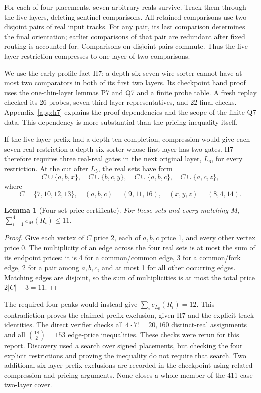 \documentclass[11pt]{article}
\newtheorem{lemma}[theorem]{Lemma}
\begin{document}
For each of four placements, seven arbitrary reals survive. Track them through the five layers, deleting sentinel comparisons. All retained comparisons use two disjoint pairs of real input tracks. For any pair, its last comparison determines the final orientation; earlier comparisons of that pair are redundant after fixed routing is accounted for. Comparisons on disjoint pairs commute. Thus the five-layer restriction compresses to one layer of two comparisons.

We use the early-profile fact H7: a depth-six seven-wire sorter cannot have at most two comparators in both of its first two layers. Its checkpoint hand proof uses the one-thin-layer lemmas P7 and Q7 and a finite probe table. A fresh replay checked its 26 probes, seven third-layer representatives, and 22 final checks. Appendix~\ref{app:h7} explains the proof dependencies and the scope of the finite Q7 data. This dependency is more substantial than the pricing inequality itself.

If the five-layer prefix had a depth-ten completion, compression would give each seven-real restriction a depth-six sorter whose first layer has two gates. H7 therefore requires three real-real gates in the next original layer, $L_6$, for every restriction. At the cut after $L_5$, the real sets have form
\[
C\cup\{a,b,x\},\quad C\cup\{b,c,y\},\quad
C\cup\{a,b,c\},\quad C\cup\{a,c,z\},
\]
where
\[
C=\{7,10,12,13\},\quad(a,b,c)=(9,11,16),\quad(x,y,z)=(8,4,14).
\]

\begin{lemma}[Four-set price certificate]\label{lem:price}
For these sets and every matching $M$, $\sum_{i=1}^4e_M(R_i)\le11$.
\end{lemma}
\begin{proof}
Give each vertex of $C$ price 2, each of $a,b,c$ price 1, and every other vertex price 0. The multiplicity of an edge across the four real sets is at most the sum of its endpoint prices: it is 4 for a common/common edge, 3 for a common/fork edge, 2 for a pair among $a,b,c$, and at most 1 for all other occurring edges. Matching edges are disjoint, so the sum of multiplicities is at most the total price $2|C|+3=11$.
\end{proof}

The required four peaks would instead give $\sum_i e_{L_6}(R_i)=12$. This contradiction proves the claimed prefix exclusion, given H7 and the explicit track identities. The direct verifier checks all $4\cdot7!=20,160$ distinct-real assignments and all $\binom{18}{2}=153$ edge-price inequalities. These checks were rerun for this report. Discovery used a search over signed placements, but checking the four explicit restrictions and proving the inequality do not require that search. Two additional six-layer prefix exclusions are recorded in the checkpoint using related compression and pricing arguments. None closes a whole member of the 411-case two-layer cover.
\end{document}

